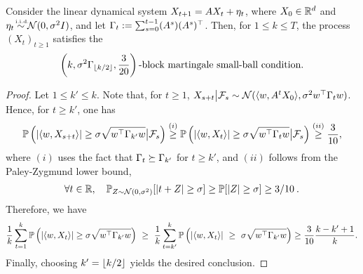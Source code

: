 \begin{prop}\label{prop:linear_system_small_ball_full} Consider the linear dynamical system $X_{t+1} = AX_t + \eta_t $, where $X_0 \in \mathbb{R}^d$ and $\noise_t  \iid \calN(0,\sigma^2 I)$, and let  $\Gamma_t :=  \sum_{s=0}^{t-1} (A^{s})(A^s)^{\top}$. Then, for $1 \leq k \leq T$, the process $( X_t )_{t \ge 1}$ satisfies the
\begin{eqnarray}
\left(k, \sigma^2 \Gamma_{\lfloor k/2\rfloor}, \frac{3}{20}\right)\text{-block martingale small-ball condition.}
\end{eqnarray}
\end{prop}
\begin{proof}
Let $1\leq k' \leq k$. Note that, for $t \ge 1$, $X_{s+t} \big{|} \mathcal{F}_{s} \sim \mathcal{N}(\langle w, A^t X_0\rangle, \sigma^2 w^\top \Gamma_t w)$. Hence, for $t \ge k'$, one has 
\begin{eqnarray*}
\mathbb{P}\left(|\langle w, X_{s+t}\rangle| \geq \sigma \sqrt{w^\top \Gamma_{k'}w} \big{|} \mathcal{F}_s \right) \overset{(i)}{\ge} \mathbb{P}\left(|\langle w, X_t\rangle| \geq \sigma \sqrt{w^\top \Gamma_{t}w}  \big{|} \mathcal{F}_s\right) 
\overset{(ii)}{\ge} \frac{3}{10},
\end{eqnarray*}
where $(i)$ uses the fact that $\Gamma_t \succeq \Gamma_{k'}$ for $t \ge k'$, and $(ii)$ follows from the Paley-Zygmund lower bound,
\begin{eqnarray}\label{eq:paley_zygmund}
\forall t \in \mathbb{R}, \quad \mathbb{P}_{Z \sim \mathcal{N}(0,\sigma^2)}[|t+Z| \ge \sigma]  \ge \mathbb{P}[|Z| \geq \sigma] \geq 3/10 \:.
\end{eqnarray}
Therefore, we have
\begin{eqnarray*}
\frac{1}{k} \sum_{t = 1}^k \mathbb{P}\left(|\langle w, X_t\rangle| \geq \sigma \sqrt{w^\top \Gamma_{k'}w}\right) ~\geq~  \frac{1}{k} \sum_{t = k'}^k \mathbb{P}\left(|\langle w, X_t\rangle| ~\geq~ \sigma \sqrt{w^\top \Gamma_{k'}w}\right)
\geq  \frac{3}{10}\frac{k - k' + 1}{k}.
\end{eqnarray*}
Finally, choosing $k' = \lfloor k/2\rfloor$ yields the desired conclusion.
\end{proof}









